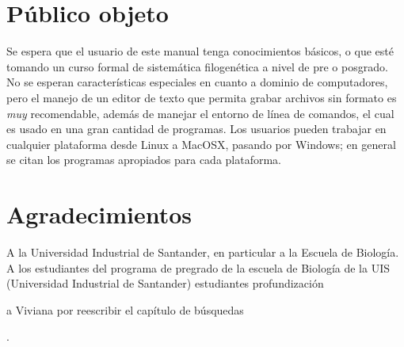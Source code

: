\section*{P\'ublico objeto}
Se espera que el usuario de este manual tenga conocimientos b\'asicos, o que est\'e tomando un curso formal de sistem\'atica filogen\'etica a nivel de pre o posgrado. No se esperan caracter\'isticas especiales en cuanto a dominio de computadores, pero el manejo de un editor de texto que permita grabar archivos sin formato es \emph{muy} recomendable, adem\'as de manejar el entorno de l\'inea de comandos, el cual es usado en una gran cantidad de programas. Los usuarios pueden trabajar en cualquier plataforma desde Linux a MacOSX, pasando por Windows; en general se citan los programas apropiados para cada plataforma.


\section*{Agradecimientos}
A la Universidad Industrial de Santander, en particular a la Escuela de Biolog\'ia. A los estudiantes del programa de pregrado de la escuela de Biolog\'ia de la UIS (Universidad Industrial de Santander) 
estudiantes profundizaci\'on

a Viviana por reescribir el cap\'itulo de b\'usquedas



.